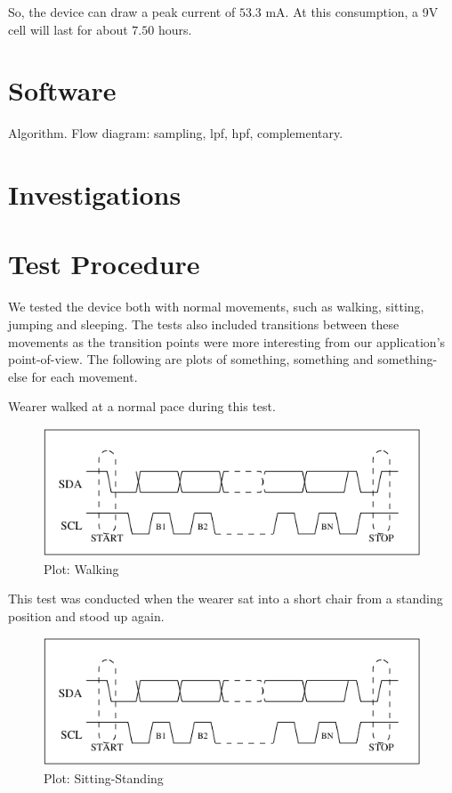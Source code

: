 \documentclass[11pt, a4paper]{article}
\begin{document}
\noindent So, the device can draw a peak current of $53.3$ mA. At this
consumption, a 9V cell will last for about $7.50$ hours.

\section{Software}
Algorithm.
Flow diagram: sampling, lpf, hpf, complementary.

\section{Investigations}


\section{Test Procedure}
We tested the device both with normal movements, such as walking, sitting,
jumping and sleeping. The tests also included transitions between these
movements as the transition points were more interesting from our
application's point-of-view. The following are plots of {\color{red}
something, something and something-else} for each movement.

\noindent Wearer walked at a normal pace during this test. 
\begin{figure}
    \centering
    \includegraphics[width=\linewidth]{I2C_Timing.pdf}
    \caption{Plot: Walking}
    \label{fig:walking}
\end{figure}

\noindent This test was conducted when the wearer sat into a short chair from a
standing position and stood up again.
\begin{figure}
    \centering
    \includegraphics[width=\linewidth]{I2C_Timing.pdf}
    \caption{Plot: Sitting-Standing}
    \label{fig:sitting_standing}
\end{figure}
\end{document}
